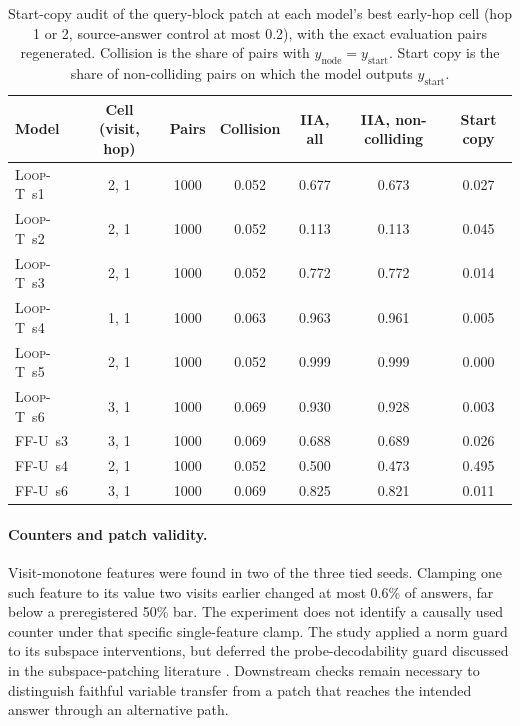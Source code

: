 \documentclass[10pt,letterpaper]{article}
\newcommand{\LoopT}{\textsc{Loop-T}}
\newcommand{\FFU}{\textsc{FF-U}}
\begin{document}
\begin{table}[t]
\centering\small
\begin{tabular}{lcccccc}
\toprule
Model & Cell (visit, hop) & Pairs & Collision & IIA, all & IIA, non-colliding & Start copy \\
\midrule
\LoopT\ s1 & 2, 1 & 1000 & 0.052 & 0.677 & 0.673 & 0.027 \\
\LoopT\ s2 & 2, 1 & 1000 & 0.052 & 0.113 & 0.113 & 0.045 \\
\LoopT\ s3 & 2, 1 & 1000 & 0.052 & 0.772 & 0.772 & 0.014 \\
\LoopT\ s4 & 1, 1 & 1000 & 0.063 & 0.963 & 0.961 & 0.005 \\
\LoopT\ s5 & 2, 1 & 1000 & 0.052 & 0.999 & 0.999 & 0.000 \\
\LoopT\ s6 & 3, 1 & 1000 & 0.069 & 0.930 & 0.928 & 0.003 \\
\FFU\ s3 & 3, 1 & 1000 & 0.069 & 0.688 & 0.689 & 0.026 \\
\FFU\ s4 & 2, 1 & 1000 & 0.052 & 0.500 & 0.473 & 0.495 \\
\FFU\ s6 & 3, 1 & 1000 & 0.069 & 0.825 & 0.821 & 0.011 \\
\bottomrule
\end{tabular}
\caption{Start-copy audit of the query-block patch at each model's best early-hop cell (hop 1 or 2, source-answer control at most 0.2), with the exact evaluation pairs regenerated. Collision is the share of pairs with $y_{\mathrm{node}}=y_{\mathrm{start}}$. Start copy is the share of non-colliding pairs on which the model outputs $y_{\mathrm{start}}$.}
\label{tab:collision}
\end{table}

\paragraph{Counters and patch validity.} Visit-monotone features were found in two of the three tied seeds. Clamping one such feature to its value two visits earlier changed at most 0.6\% of answers, far below a preregistered 50\% bar. The experiment does not identify a causally used counter under that specific single-feature clamp. The study applied a norm guard to its subspace interventions, but deferred the probe-decodability guard discussed in the subspace-patching literature \cite{makelov}. Downstream checks remain necessary to distinguish faithful variable transfer from a patch that reaches the intended answer through an alternative path.
\end{document}
